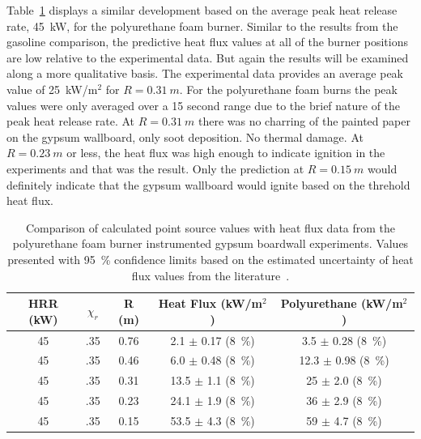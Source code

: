 \documentclass[twoside]{uocthesis}
\begin{document}
{Table~\ref{tab:Point_Source_HFPUF} displays a similar development based on the average peak heat release rate, 45~kW, for the polyurethane foam burner.
Similar to the results from the gasoline comparison, the predictive heat flux values at all of the burner positions are low relative to the experimental data.  But again the results will be examined along a more qualitative basis. The experimental data provides an average peak value of 25~kW/m$^2$ for $R=0.31~m$. For the polyurethane foam burns the peak values were only averaged over a 15 second range due to the brief nature of the peak heat release rate. At $R=0.31~m$ there was no charring of the painted paper on the gypsum wallboard, only soot deposition.  No thermal damage.  At $R=0.23~m$ or less, the heat flux was high enough to indicate ignition in the experiments and that was the result.  Only the prediction at $R=0.15~m$ would definitely indicate that the gypsum wallboard would ignite based on the threhold heat flux.           

\begin{table}
	\centering
	\footnotesize
	\begin{tabular}{|c|c|c|c|c|}
	\hline
		HRR (kW) &   $\chi_r$   & R (m)	     & Heat Flux (kW/m$^2$)     &  Polyurethane (kW/m$^2$)    	\\ \hline \hline
		45       &   .35 		& 0.76 	     & 2.1 $\pm$ 0.17 (8~\%) 	&  3.5 $\pm$ 0.28 (8~\%) 	   	 \\
		45       &   .35    	& 0.46	     & 6.0 $\pm$ 0.48 (8~\%) 	&  12.3 $\pm$ 0.98 (8~\%)  	     \\
		45       &   .35 		& 0.31	     & 13.5 $\pm$ 1.1 (8~\%) 	&  25 $\pm$ 2.0 (8~\%)   	      \\
        45       &   .35 		& 0.23	     & 24.1 $\pm$ 1.9 (8~\%) 	&  36 $\pm$ 2.9 (8~\%)		      \\
        45       &   .35 		& 0.15	     & 53.5 $\pm$ 4.3 (8~\%) 	&  59 $\pm$ 4.7 (8~\%)   	       \\
	\hline
	\end{tabular}
	\caption[Comparison of calculated point source values (HRR = 45~kW) with heat flux data from the instrumented gypsum boardwall experiments]{Comparison of calculated point source values with heat flux data from the polyurethane foam burner instrumented gypsum boardwall experiments. Values presented with 95~\% confidence limits based on the estimated uncertainty of heat flux values from the literature~\cite{Pitts:2006}.}
	\label{tab:Point_Source_HFPUF}
\end{table}

}
\end{document}
